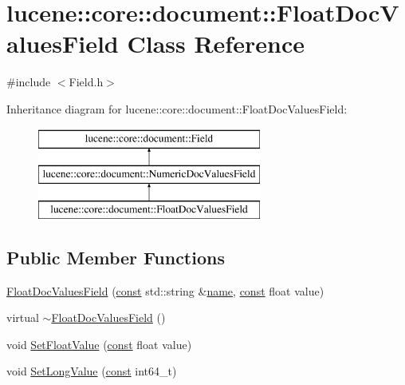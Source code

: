 \hypertarget{classlucene_1_1core_1_1document_1_1FloatDocValuesField}{}\section{lucene\+:\+:core\+:\+:document\+:\+:Float\+Doc\+Values\+Field Class Reference}
\label{classlucene_1_1core_1_1document_1_1FloatDocValuesField}


{\ttfamily \#include $<$Field.\+h$>$}

Inheritance diagram for lucene\+:\+:core\+:\+:document\+:\+:Float\+Doc\+Values\+Field\+:\begin{figure}[H]
\begin{center}
\leavevmode
\includegraphics[height=3.000000cm]{classlucene_1_1core_1_1document_1_1FloatDocValuesField}
\end{center}
\end{figure}
\subsection*{Public Member Functions}
\begin{DoxyCompactItemize}
\item 
\mbox{\hyperlink{classlucene_1_1core_1_1document_1_1FloatDocValuesField_a28e0d07c18f49ce7b7b77bcc803ab60b}{Float\+Doc\+Values\+Field}} (\mbox{\hyperlink{ZlibCrc32_8h_a2c212835823e3c54a8ab6d95c652660e}{const}} std\+::string \&\mbox{\hyperlink{classlucene_1_1core_1_1document_1_1Field_a52f673f3b3abb14b180f5159f4726537}{name}}, \mbox{\hyperlink{ZlibCrc32_8h_a2c212835823e3c54a8ab6d95c652660e}{const}} float value)
\item 
virtual \mbox{\hyperlink{classlucene_1_1core_1_1document_1_1FloatDocValuesField_a5b783d4241b971134aa15a69d39d5e39}{$\sim$\+Float\+Doc\+Values\+Field}} ()
\item 
void \mbox{\hyperlink{classlucene_1_1core_1_1document_1_1FloatDocValuesField_a929d0812b571be2208f51d420b0dd9ed}{Set\+Float\+Value}} (\mbox{\hyperlink{ZlibCrc32_8h_a2c212835823e3c54a8ab6d95c652660e}{const}} float value)
\item 
void \mbox{\hyperlink{classlucene_1_1core_1_1document_1_1FloatDocValuesField_a27b6b009471cbaa1b0baf8facb97fa6d}{Set\+Long\+Value}} (\mbox{\hyperlink{ZlibCrc32_8h_a2c212835823e3c54a8ab6d95c652660e}{const}} int64\+\_\+t)
\end{DoxyCompactItemize}
